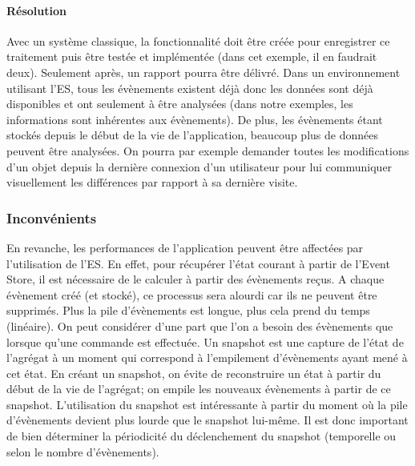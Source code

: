 \paragraph{Résolution} Avec un système classique, la fonctionnalité doit être 
créée pour enregistrer ce traitement puis être testée et implémentée (dans cet 
exemple, il en faudrait deux). Seulement après, un rapport pourra être délivré. 
Dans un environnement utilisant l'\gls{ES}, tous les évènements existent déjà 
donc les données sont déjà disponibles et ont seulement à être analysées 
(dans 
notre exemples, les informations sont inhérentes aux évènements). De plus, les 
évènements étant stockés depuis le début de la vie de l'application, beaucoup plus de données peuvent être analysées. On 
	pourra par 
exemple demander toutes les modifications d'un objet depuis la dernière 
connexion d'un utilisateur pour lui communiquer visuellement les différences par 
rapport à sa dernière visite.



\subsubsection{Inconvénients}
En revanche, les performances de l'application peuvent être affectées par 
l'utilisation de 
l'\gls{ES}. En effet, pour récupérer l'état courant à partir de l'Event Store, il est 
nécessaire de le calculer à partir des évènements reçus.
A chaque évènement créé (et stocké), ce processus sera alourdi car ils ne 
peuvent être supprimés. Plus la pile d'évènements est longue, plus cela prend 
du temps (linéaire). On peut considérer d'une part que l'on a besoin des 
évènements que lorsque qu'une commande est effectuée. Un \gls{snapshot} est une capture de l'état de l'agrégat à un 
moment qui correspond à l'empilement d'évènements ayant mené à cet état. En 
créant un \gls{snapshot}, on évite de reconstruire un état à partir du début de la 
vie de l'agrégat; on empile les nouveaux évènements à partir de ce snapshot. 
L'utilisation du \gls{snapshot} est intéressante à partir du moment où la pile 
d'évènements devient plus lourde que le \gls{snapshot} lui-même. Il est donc 
important de bien déterminer la périodicité du déclenchement du \gls{snapshot} 
(temporelle ou selon le nombre d'évènements).

